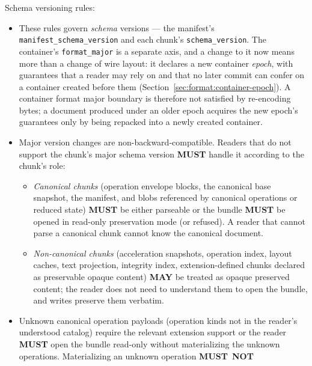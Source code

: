 \documentclass[11pt,letterpaper]{report}
\newcounter{requirement}[chapter]
\newcommand{\MUST}{\textbf{MUST}}
\newcommand{\MUSTNOT}{\textbf{MUST}\nobreak\ \textbf{NOT}}
\newcommand{\MAY}{\textbf{MAY}}
\begin{document}
\begin{requirement}
  \label{req:format:schema-version-compatibility}
  Schema versioning rules:

  \begin{itemize}
    \item These rules govern \emph{schema} versions --- the manifest's
      \texttt{manifest\_schema\_version} and each chunk's
      \texttt{schema\_version}. The container's
      \texttt{format\_major} is a separate axis, and a change to it
      now means more than a change of wire layout: it declares a new
      container \emph{epoch}, with guarantees that a reader may rely
      on and that no later commit can confer on a container created
      before them (Section~\ref{sec:format:container-epoch}). A
      container format major boundary is therefore not satisfied by
      re-encoding bytes; a document produced under an older epoch
      acquires the new epoch's guarantees only by being repacked into
      a newly created container.
    \item Major version changes are non-backward-compatible.
      Readers that do not support the chunk's major schema
      version \MUST{} handle it according to the chunk's role:
      \begin{itemize}
        \item \emph{Canonical chunks} (operation envelope blocks,
          the canonical base snapshot, the manifest, and blobs
          referenced by canonical operations or reduced state)
          \MUST{} be either parseable or the bundle \MUST{} be
          opened in read-only preservation mode (or refused). A
          reader that cannot parse a canonical chunk cannot know
          the canonical document.
        \item \emph{Non-canonical chunks} (acceleration
          snapshots, operation index, layout caches, text
          projection, integrity index, extension-defined chunks
          declared as preservable opaque content)
          \MAY{} be treated as opaque preserved content; the
          reader does not need to understand them to open the
          bundle, and writes preserve them verbatim.
      \end{itemize}
    \item Unknown canonical operation payloads (operation kinds
      not in the reader's understood catalog) require the
      relevant extension support or the reader \MUST{} open the
      bundle read-only without materializing the unknown
      operations. Materializing an unknown operation \MUSTNOT{}

\end{itemize}
\end{requirement}
\end{document}
